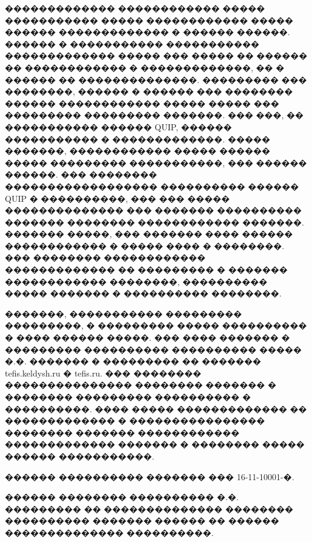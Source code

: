 \documentclass[12pt,titlepage]{article}
\begin{document}
������������� ������������ ����� ����������� ����� ������������ ����� ������ ������������� � ������ ������. ������ � ����������� ����������� ������������� ����� ��� ����� �� ������ �� ������������ � �������������, �� � ������ �� ��������������. ��������� ��� ��������, ������ � ������ \cite{Kalitkin2006} ��� �������� ������ ������������ ����� ����� ��� ��������� ��������� �������. ��� ���, �� ����������� ������ QUIP, ������ ����������� � �������������. ����� �������, ������������ ����� ������ ����� ��������� �����������, ��� ������ ������. ��� �������� ������������������ ���������� ������ QUIP � ����������, ��� ��� ����� �������������� ��� ������� ���������� ������� �������� ������������ �������. ������� �����, ��� ������� ���� ������ ������������ � ����� ���� � ��������. ��� �������� ������������ ������������� �� ��������� � ������� ������������ ��������, ���������� ����� ������� � ���������� ��������.

�������, ����������� ��������� ���������, � ��������� ����� ���������� � ���� ������ �����. ��� ���� ������� � ��������� ���������� ���������� ����� �.�. ������� � ��������� �� ������� tefis.keldysh.ru � tefis.ru. ��� �������� ��������������� �������� ������� � �������� ��������� ���������� � ����������. ���� ����� ������������� �� ������������� � ���������������� �������� ������� ������������ ������������� ������� � �������� ����� ������ �����������.

������ ���������� ������� ��� 16-11-10001-�.

������ �������� ���������� �.�. ��������� �� �������������� �������� ���������� ������� ������ �� ������ �������������� ����������.
\end{document}
